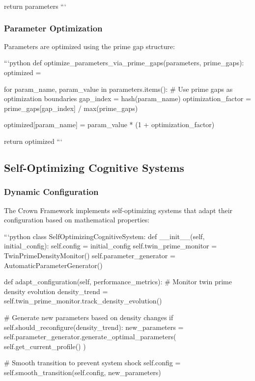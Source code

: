 \documentclass[12pt,a4paper]{article}
\begin{document}
        return parameters
```

\subsubsection{Parameter Optimization}

Parameters are optimized using the prime gap structure:

```python
def optimize_parameters_via_prime_gaps(parameters, prime_gaps):
    optimized = {}
    
    for param_name, param_value in parameters.items():
        # Use prime gaps as optimization boundaries
        gap_index = hash(param_name) %
        optimization_factor = prime_gaps[gap_index] / max(prime_gaps)
        
        optimized[param_name] = param_value * (1 + optimization_factor)
    
    return optimized
```

\subsection{Self-Optimizing Cognitive Systems}

\subsubsection{Dynamic Configuration}

The Crown Framework implements self-optimizing systems that adapt their configuration based on mathematical properties:

```python
class SelfOptimizingCognitiveSystem:
    def __init__(self, initial_config):
        self.config = initial_config
        self.twin_prime_monitor = TwinPrimeDensityMonitor()
        self.parameter_generator = AutomaticParameterGenerator()
        
    def adapt_configuration(self, performance_metrics):
        # Monitor twin prime density evolution
        density_trend = self.twin_prime_monitor.track_density_evolution()
        
        # Generate new parameters based on density changes
        if self.should_reconfigure(density_trend):
            new_parameters = self.parameter_generator.generate_optimal_parameters(
                self.get_current_profile()
            )
            
            # Smooth transition to prevent system shock
            self.config = self.smooth_transition(self.config, new_parameters)
            
\end{document}
